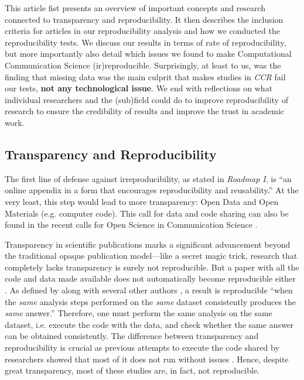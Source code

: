 This article fist presents an overview of important concepts and research connected to transparency and reproducibility.
It then describes the inclusion criteria for articles in our reproducibility analysis and how we conducted the reproducibility tests.
We discuss our results in terms of rate of reproducibility, but more importantly also detail which issues we found to make Computational Communication Science (ir)reproducible.
Surprisingly, at least to us, was the finding that missing data was the main culprit that makes studies in \textit{CCR} fail our tests, \textbf{not any technological issue}.
We end with reflections on what individual researchers and the (sub)field could do to improve reproducibility of research to ensure the credibility of results and improve the trust in academic work.

\subsection{Transparency and Reproducibility}

The first line of defense against irreproducibility, as stated in \textit{Roadmap I}, is ``an online appendix in a form that encourages reproducibility and reusability.'' At the very least, this step would lead to more transparency: Open Data and Open Materials (e.g. computer code). This call for data and code sharing can also be found in the recent calls for Open Science in Communication Science \parencite[]{dienlin:2020:AOS,bowman:2020:CBP,lewis:2019:OCS}.

Transparency in scientific publications marks a significant advancement beyond the traditional opaque publication model---like a secret magic trick, research that completely lacks transparency is surely not reproducible. But a paper with all the code and data made available does not automatically become reproducible either \parencite[]{peng:2011:RRC}. As defined by \textcite{The_Turing_Way:2022} along with several other authors \parencite[i.e.,][]{schoch:2023:CRC,broman2017recommendations}, a result is reproducible ``when the
\textit{same} analysis steps performed on the \textit{same} dataset consistently produces the \textit{same} answer.''
Therefore, one must perform the same analysis on the same dataset, i.e. execute the code with the data, and check whether the same answer can be obtained consistently.
The difference between transparency and reproducibility is crucial as previous attempts to execute the code shared by researchers showed that most of it does not run without issues \parencite[]{cruewell:2023:WB,trisovic:2022}.
Hence, despite great transparency, most of these studies are, in fact, not reproducible.

